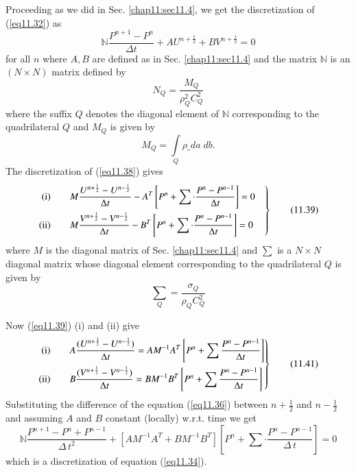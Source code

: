 Proceeding as we did in Sec. \ref{chap11:sec11.4}, we get the discretization of (\ref{eq11.32}) as 
\begin{equation*}
\mathbb{N} \frac{P^{n+1} - P^n}{\Delta t} + A U^{n+\frac{1}{2}} + BV^{n+\frac{1}{2}} = 0
\tag{11.36}\label{eq11.36}
\end{equation*}
for all $n$ where $A, B$ are defined as in Sec. \ref{chap11:sec11.4} and the matrix $\mathbb{N}$ is an $(N \times N)$ matrix defined by
\begin{equation*}
N_Q = \frac{M_Q}{\rho^2_Q C^2_Q}\tag{11.37}\label{eq11.37}
\end{equation*}
where the suffix $Q$ denotes the diagonal element of $\mathbb{N}$ corresponding to the quadrilateral $Q$ and $M_Q$ is given by 
\begin{equation*}
M_Q = \int\limits_Q \rho_\circ da \; db. \tag{11.38}\label{eq11.38}
\end{equation*}\pageoriginale 
The discretization of (\ref{eq11.38}) gives 
\begin{equation*}
\left. 
\begin{aligned}
{\rm (i)} & \qquad M \frac{U^{n+\frac{1}{2}} - U^{n-\frac{1}{2}}}{\Delta t}  - A^T \left[ P^n + \sum \cdot \frac{P^n - P^{n-1}}{\Delta t} \right] =0 \quad \\
{\rm (ii)} & \qquad M \frac{V^{n+\frac{1}{2}} - V^{n-\frac{1}{2}}}{\Delta t}  - B^T \left[ P^n + \sum \cdot \frac{P^n - P^{n-1 }}{\Delta t} \right] = 0 \quad\\
\end{aligned}
\right\}
\tag{11.39}\label{eq11.39}
\end{equation*}
where $M$ is the diagonal matrix of Sec. \ref{chap11:sec11.4} and $\sum$ is a $N \times N$ diagonal matrix whose diagonal element corresponding to the quadrilateral $Q$ is given by 
\begin{equation*}
\sum_Q = \frac{\sigma_Q}{\rho_Q C^2_Q}
\tag{11.40}\label{eq11.40}
\end{equation*}

Now (\ref{eq11.39}) (i) and (ii) give 
\begin{equation*}
\left.
\begin{aligned}
{\rm (i)} & \qquad A \frac{(U^{n+\frac{1}{2}} - U^{n - \frac{1}{2}})}{\Delta t }  = A M^{-1} A^T \left[ P^n + \sum \frac{P^n- P^{n-1}}{\Delta t} \right]\\
{\rm (ii)} & \qquad B \frac{(V^{n+\frac{1}{2}} - V^{n - \frac{1}{2}})}{\Delta t }  = B M^{-1} B^T \left[ P^n + \sum \frac{P^n- P^{n-1}}{\Delta t} \right]\\
\end{aligned}
\right\}
\tag{11.41}\label{eq11.41}
\end{equation*}
Substituting the difference of the equation (\ref{eq11.36}) between $n+ \frac{1}{2}$ and $n-\frac{1}{2}$ and assuming $A$ and $B$ constant (locally) w.r.t. time we get
\begin{equation*}
\mathbb{N} \frac{P^{n+1}- P^n + P^{n-1}}{\Delta\, t^2}
+ \left[ AM^{-1} A^T + BM^{-1} B^T \right] \left[ P^n + \sum \cdot
  \frac{P^n - P^{n-1}}{\Delta \, t}\right] =0  
\tag{11.42}\label{eq11.42}
\end{equation*}
which is a discretization of equation (\ref{eq11.34}).

